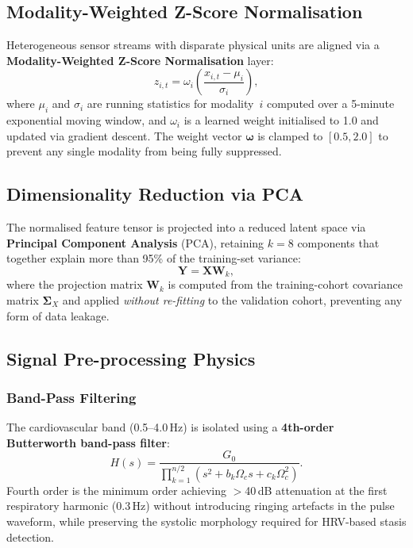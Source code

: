 \documentclass[conference]{IEEEtran}
\begin{document}
\subsection{Modality-Weighted Z-Score Normalisation}
Heterogeneous sensor streams with disparate physical units are aligned
via a \textbf{Modality-Weighted Z-Score Normalisation} layer:
\begin{equation}
  z_{i,t} = \omega_i \left(\frac{x_{i,t} - \mu_i}{\sigma_i}\right),
  \label{eq:znorm}
\end{equation}
where $\mu_i$ and $\sigma_i$ are running statistics for modality~$i$
computed over a 5-minute exponential moving window, and $\omega_i$ is a
learned weight initialised to 1.0 and updated via gradient descent.
The weight vector $\boldsymbol{\omega}$ is clamped to $[0.5, 2.0]$ to
prevent any single modality from being fully suppressed.

\subsection{Dimensionality Reduction via PCA}
The normalised feature tensor is projected into a reduced latent space
via \textbf{Principal Component Analysis} (PCA), retaining $k = 8$
components that together explain more than 95\% of the training-set
variance:
\begin{equation}
  \mathbf{Y} = \mathbf{X}\mathbf{W}_k,
  \label{eq:pca}
\end{equation}
where the projection matrix $\mathbf{W}_k$ is computed from the
training-cohort covariance matrix $\boldsymbol{\Sigma}_X$ and applied
\textit{without re-fitting} to the validation cohort, preventing any
form of data leakage.

\subsection{Signal Pre-processing Physics}

\subsubsection{Band-Pass Filtering}
The cardiovascular band (0.5--4.0\,Hz) is isolated using a
\textbf{4th-order Butterworth band-pass filter}:
\begin{equation}
  H(s) = \frac{G_0}{\displaystyle\prod_{k=1}^{n/2}
    \left(s^2 + b_k\Omega_c s + c_k\Omega_c^2\right)}.
  \label{eq:butterworth}
\end{equation}
Fourth order is the minimum order achieving $>$40\,dB attenuation at
the first respiratory harmonic (0.3\,Hz) without introducing ringing
artefacts in the pulse waveform, while preserving the systolic
morphology required for HRV-based stasis detection.
\end{document}
